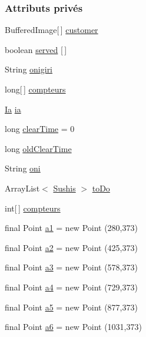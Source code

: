 \subsubsection*{Attributs privés}
\begin{DoxyCompactItemize}
\item 
Buffered\+Image\mbox{[}$\,$\mbox{]} \hyperlink{classSuchi_1_1Client_a046d048c1578b8d748d09e7efaaebb12}{customer}
\item 
boolean \hyperlink{classSuchi_1_1Client_a543ce771d09e264df72783f30bcb2a05}{served} \mbox{[}$\,$\mbox{]}
\item 
String \hyperlink{classSuchi_1_1Client_a0d8eba93c20ea516917b12db42233ea4}{onigiri}
\item 
long\mbox{[}$\,$\mbox{]} \hyperlink{classSuchi_1_1Client_a6f5dcd685fb0d9bede8b40feaf618ba2}{compteurs}
\item 
\hyperlink{classSuchi_1_1Ia}{Ia} \hyperlink{classSuchi_1_1Client_a1081e8917f8ab6e73a16188230466238}{ia}
\item 
long \hyperlink{classSuchi_1_1Client_acfd362a167b9e4d091ab44af7d0d1592}{clear\+Time} = 0
\item 
long \hyperlink{classSuchi_1_1Client_adb0ad87962ba3a22c4ab0c4553211606}{old\+Clear\+Time}
\item 
String \hyperlink{classSuchi_1_1Client_a934abfd3eaf4306d165bcbda8cc22ee0}{oni}
\item 
Array\+List$<$ \hyperlink{enumSuchi_1_1Client_1_1Sushis}{Sushis} $>$ \hyperlink{classSuchi_1_1Client_ad8f1efef85f217db94de5bfb30ff6a60}{to\+Do}
\item 
int\mbox{[}$\,$\mbox{]} \hyperlink{classSuchi_1_1Client_a8bdd5e9661c04f49b0709016a606b458}{compteurs}
\item 
final Point \hyperlink{classSuchi_1_1Client_a73039e1ad15b729f9432670b85e34b3b}{a1} = new Point (280,373)
\item 
final Point \hyperlink{classSuchi_1_1Client_a79d43b768d46513e88699479f8c990a3}{a2} = new Point (425,373)
\item 
final Point \hyperlink{classSuchi_1_1Client_a192135bbe1b59fd33d1bc0bdabc8037d}{a3} = new Point (578,373)
\item 
final Point \hyperlink{classSuchi_1_1Client_afcbd53977c80f31d0b75d8ff5a99ff6c}{a4} = new Point (729,373)
\item 
final Point \hyperlink{classSuchi_1_1Client_a7b43715a5440aafd01faa6816ab60ac4}{a5} = new Point (877,373)
\item 
final Point \hyperlink{classSuchi_1_1Client_ab2d3ab062091c7500b984738023c78b5}{a6} = new Point (1031,373)
\end{DoxyCompactItemize}


